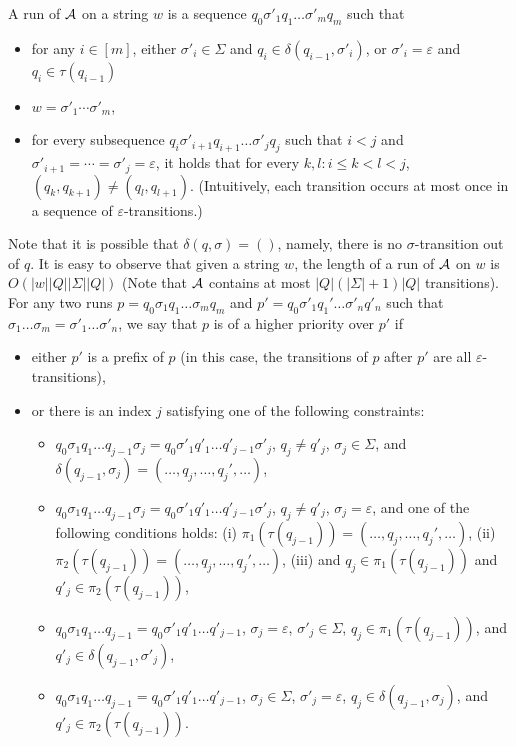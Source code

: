 A  run of $\mathcal{A}$ on a string $w$ is a sequence $q_0 \sigma'_1 q_1 \ldots \sigma'_m q_m$ such that 
\begin{itemize}
\item for any $i \in [m]$, either $\sigma'_i \in \Sigma$ and $q_i \in \delta (q_{i - 1}, \sigma'_i)$, or $\sigma'_i = \varepsilon$ and $q_i \in \tau(q_{i-1})$ %
\item $w = \sigma'_1 \cdots \sigma'_m$,
%
\item for every subsequence $q_i \sigma'_{i+1} q_{i+1} \ldots \sigma'_{j} q_j$ such that  $i < j$ and $\sigma'_{i+1} = \cdots = \sigma'_j = \varepsilon$, it holds that for every $k, l: i \le k < l < j$, $(q_k, q_{k+1}) \neq (q_l, q_{l+1})$.
(Intuitively, each transition occurs at most once in a sequence of $\varepsilon$-transitions.) 
\end{itemize}
Note that it is possible that $\delta(q, \sigma) = ()$, namely, there is no $\sigma$-transition out of $q$. 
It is easy to observe that given a string $w$, the length of a run of $\mathcal{A}$ on $w$ is $O(|w||Q| |\Sigma| |Q|)$ (Note that $\mathcal{A}$ contains at most $|Q| (|\Sigma|+1) |Q|$ transitions). 
For any two runs $p = q_0 \sigma_1 q_1 \ldots \sigma_m q_m$ and $p' =  q_0 \sigma'_1 q_1' \ldots \sigma'_n q'_n$ such that $\sigma_1 \ldots \sigma_m = \sigma'_1 \ldots \sigma'_n$, we say that $p$ is of a higher priority over $p'$ if 
\begin{itemize}
\item either $p'$ is a prefix of $p$ (in this case, the transitions of $p$ after $p'$ are all $\varepsilon$-transitions), 
%
\item or there is an index $j$ satisfying one of the following constraints:
\begin{itemize}
\item $q_0 \sigma_1 q_1 \ldots q_{j-1} \sigma_j = q_0 \sigma'_1 q'_1 \ldots q'_{j-1} \sigma'_j$, $q_j \neq q'_j$, $\sigma_j \in \Sigma$, and $\delta (q_{j - 1}, \sigma_j) =(\ldots, q_j, \ldots, q_j', \ldots)$,
%
\item $q_0 \sigma_1 q_1 \ldots q_{j-1} \sigma_j = q_0 \sigma'_1 q'_1 \ldots q'_{j-1} \sigma'_j$, $q_j \neq q'_j$, $\sigma_j  = \varepsilon$,  and one of the following conditions holds: (i) $\pi_1(\tau(q_{j - 1})) = (\ldots, q_j, \ldots, q_j', \ldots)$, (ii) $\pi_2(\tau(q_{j - 1})) = (\ldots, q_j, \ldots, q_j', \ldots)$, (iii) and $q_j \in \pi_1(\tau(q_{j - 1}))$ and $q'_j \in \pi_2(\tau(q_{j-1}))$, 
%
\item $q_0 \sigma_1 q_1 \ldots q_{j-1}  = q_0 \sigma'_1 q'_1 \ldots q'_{j-1} $, $\sigma_j  = \varepsilon$, $\sigma'_j  \in \Sigma$, $q_j \in \pi_1(\tau(q_{j - 1}))$, and $q'_j \in \delta(q_{j-1}, \sigma'_j)$, 
%
\item $q_0 \sigma_1 q_1 \ldots q_{j-1}  = q_0 \sigma'_1 q'_1 \ldots q'_{j-1} $, $\sigma_j  \in \Sigma$, $\sigma'_j  = \varepsilon$, $q_j \in \delta(q_{j - 1}, \sigma_j)$, and $q'_j \in \pi_2(\tau(q_{j-1}))$.
\end{itemize}
\end{itemize}
